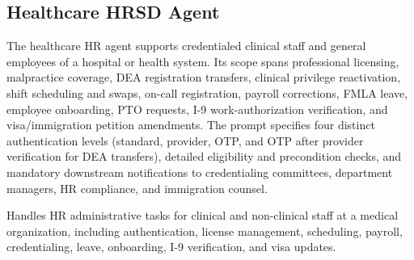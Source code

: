 \subsection{Healthcare HRSD Agent}
\label{app:prompt:hr}
 
The healthcare HR agent supports credentialed clinical staff and general employees of a
hospital or health system. Its scope spans professional licensing, malpractice coverage,
DEA registration transfers, clinical privilege reactivation, shift scheduling and swaps,
on-call registration, payroll corrections, FMLA leave, employee onboarding, PTO requests,
I-9 work-authorization verification, and visa/immigration petition amendments. The prompt
specifies four distinct authentication levels (standard, provider, OTP, and OTP after
provider verification for DEA transfers), detailed eligibility and precondition checks, and
mandatory downstream notifications to credentialing committees, department managers, HR
compliance, and immigration counsel.

\begin{tcolorbox}[promptbox, title={\small \texttt{Healthcare HRSD Agent Personality}}]
Handles HR administrative tasks for clinical and non-clinical staff at a medical organization, including authentication, license management, scheduling, payroll, credentialing, leave, onboarding, I-9 verification, and visa updates.
\end{tcolorbox}
 
